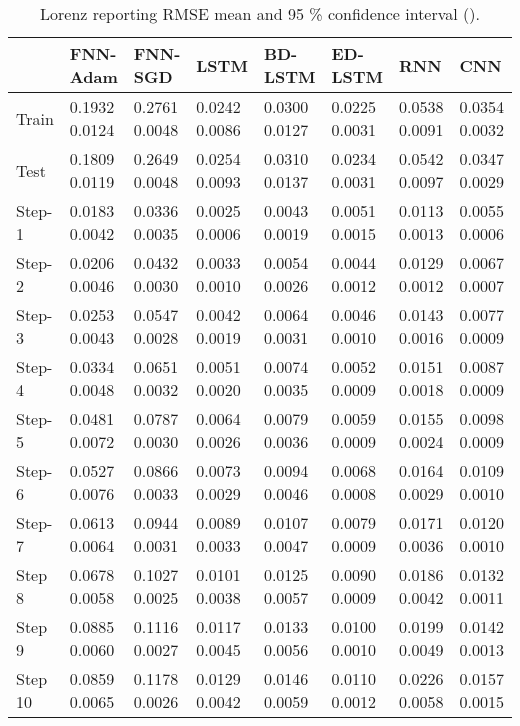 \documentclass{ieeeaccess}
\begin{document}
\begin{table*}[htbp]
\smaller 
\caption{Lorenz reporting RMSE mean and 95 \% confidence interval   ().}
\label{tab:lorenz}
\begin{tabular}{llllllll}
\hline
 &  FNN-Adam& FNN-SGD & LSTM & BD-LSTM  & ED-LSTM & RNN & CNN\\
\hline
\hline
	
Train &  
0.1932	0.0124&
0.2761	0.0048&
0.0242	0.0086&
0.0300	0.0127&
0.0225	0.0031&
0.0538	0.0091&0.0354	0.0032\\
Test &  
0.1809	0.0119&
0.2649	0.0048&
0.0254	0.0093&
0.0310	0.0137&
0.0234	0.0031&
0.0542	0.0097&	0.0347	0.0029\\
Step-1 &  
0.0183	0.0042&
0.0336	0.0035&
0.0025	0.0006&
0.0043	0.0019&
0.0051	0.0015&
0.0113	0.0013&	0.0055	0.0006\\
Step-2 &  
0.0206	0.0046&
0.0432	0.0030&
0.0033	0.0010&
0.0054	0.0026&
0.0044	0.0012&
0.0129	0.0012&	0.0067	0.0007\\
Step-3 &    
0.0253	0.0043&
0.0547	0.0028&
0.0042	0.0019&
0.0064	0.0031&
0.0046	0.0010&
0.0143	0.0016&	0.0077	0.0009\\
Step-4 &    
0.0334	0.0048&
0.0651	0.0032&
0.0051	0.0020&
0.0074	0.0035&
0.0052	0.0009&
0.0151	0.0018&0.0087	0.0009\\
Step-5 &    
0.0481	0.0072&
0.0787	0.0030&
0.0064	0.0026&
0.0079	0.0036&
0.0059	0.0009&
0.0155	0.0024&	0.0098	0.0009\\
Step-6 &    
0.0527	0.0076&
0.0866	0.0033&
0.0073	0.0029&
0.0094	0.0046&
0.0068	0.0008&
0.0164	0.0029&	0.0109	0.0010\\
Step-7 &    
0.0613	0.0064&
0.0944	0.0031&
0.0089	0.0033&
0.0107	0.0047&
0.0079	0.0009&
0.0171	0.0036&	0.0120	0.0010\\
Step 8 &    
0.0678	0.0058&
0.1027	0.0025&
0.0101	0.0038&
0.0125	0.0057&
0.0090	0.0009&
0.0186	0.0042&	0.0132	0.0011\\
Step 9 &    
0.0885	0.0060&
0.1116	0.0027&
0.0117	0.0045&
0.0133	0.0056&
0.0100	0.0010&
0.0199	0.0049&	0.0142	0.0013\\
Step 10 &    
0.0859	0.0065&
0.1178	0.0026&
0.0129	0.0042&
0.0146	0.0059&
0.0110	0.0012&
0.0226	0.0058&	0.0157	0.0015\\
\hline
 
\end{tabular}

\end{table*}
\end{document}
